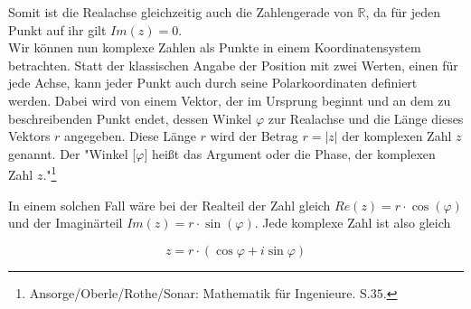 \documentclass[a4paper,12pt]{article} %
\begin{document}
Somit ist die Realachse gleichzeitig auch die Zahlengerade von $\mathbb{R}$, da für jeden Punkt auf ihr gilt $Im(z)=0$.\\



Wir können nun komplexe Zahlen als Punkte in einem Koordinatensystem betrachten.
Statt der klassischen Angabe der Position mit zwei Werten, einen für jede Achse, kann jeder Punkt auch durch seine Polarkoordinaten definiert werden.
Dabei wird von einem Vektor, der im Ursprung beginnt und an dem zu beschreibenden Punkt endet, dessen Winkel $\varphi$ zur Realachse und die Länge dieses Vektors $r$ angegeben. Diese Länge $r$ wird der Betrag $r=|z|$ der komplexen Zahl $z$ genannt.
Der "Winkel [$\varphi$] heißt das Argument oder die Phase, der komplexen Zahl $z$."\footnote{Ansorge/Oberle/Rothe/Sonar: Mathematik für Ingenieure. S.$35$.}

In einem solchen Fall wäre bei der Realteil der Zahl gleich $Re(z)=r\cdot \cos(\varphi)$ und der Imaginärteil $Im(z)=r\cdot \sin(\varphi)$.
Jede komplexe Zahl ist also gleich

\begin{equation}\label{eq.trigon}
	\boxed{z=r\cdot(\cos\varphi+i \sin\varphi)}	
\end{equation}
\end{document}
